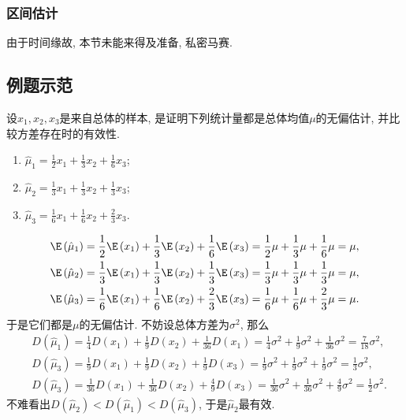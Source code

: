 \documentclass[11pt]{ctexart}
\begin{document}
\subsubsection{区间估计}

由于时间缘故, 本节未能来得及准备, 私密马赛. 

\subsection{例题示范}

\begin{example}
	设$x_1, x_2, x_3$是来自总体的样本, 是证明下列统计量都是总体均值$\mu$的无偏估计, 并比较方差存在时的有效性. 
	\begin{enumerate}[label = (\arabic*)]
		\item $\hat \mu_1 = \frac12 x_1 + \frac13 x_2 + \frac16 x_3$; 
		\item $\hat \mu_2 = \frac13 x_1 + \frac13 x_2 + \frac13 x_3$;
		\item $\hat \mu_3 = \frac16 x_1 + \frac16 x_2 + \frac23 x_3$. 
	\end{enumerate}
\end{example}
\begin{solution}
\begin{align*}
& \E\left(\hat{\mu}_1\right)=\frac{1}{2} \E\left(x_1\right)+\frac{1}{3} \E\left(x_2\right)+\frac{1}{6} \E\left(x_3\right)=\frac{1}{2} \mu+\frac{1}{3} \mu+\frac{1}{6} \mu=\mu, \\
& \E\left(\hat{\mu}_2\right)=\frac{1}{3} \E\left(x_1\right)+\frac{1}{3} \E\left(x_2\right)+\frac{1}{3} \E\left(x_3\right)=\frac{1}{3} \mu+\frac{1}{3} \mu+\frac{1}{3} \mu=\mu, \\
& \E\left(\hat{\mu}_3\right)=\frac{1}{6} \E\left(x_1\right)+\frac{1}{6} \E\left(x_2\right)+\frac{2}{3} \E\left(x_3\right)=\frac{1}{6} \mu+\frac{1}{6} \mu+\frac{2}{3} \mu=\mu.
\end{align*}
于是它们都是$\mu$的无偏估计. 
不妨设总体方差为$\sigma^2$, 那么
\begin{align*}
&D\left(\hat{\mu}_1\right)=\frac{1}{4}D\left(x_1\right)+\frac{1}{9}D\left(x_2\right)+\frac{1}{36}D\left(x_1\right)=\frac{1}{4} \sigma^2+\frac{1}{9} \sigma^2+\frac{1}{36} \sigma^2=\frac{7}{18} \sigma^2, \\
&D\left(\hat{\mu}_3\right)=\frac{1}{9}D\left(x_1\right)+\frac{1}{9}D\left(x_2\right)+\frac{1}{9}D\left(x_3\right)=\frac{1}{9} \sigma^2+\frac{1}{9} \sigma^2+\frac{1}{9} \sigma^2=\frac{1}{3} \sigma^2, \\
&D\left(\hat{\mu}_3\right)=\frac{1}{36}D\left(x_1\right)+\frac{1}{36}D\left(x_2\right)+\frac{4}{9}D\left(x_3\right)=\frac{1}{36} \sigma^2+\frac{1}{36} \sigma^2+\frac{4}{9} \sigma^2=\frac{1}{2} \sigma^2. 	
\end{align*}
不难看出$D(\hat \mu_2) < D(\hat \mu_1) < D(\hat \mu_3)$, 于是$\hat \mu_2$最有效. 
\end{solution}
\end{document}
